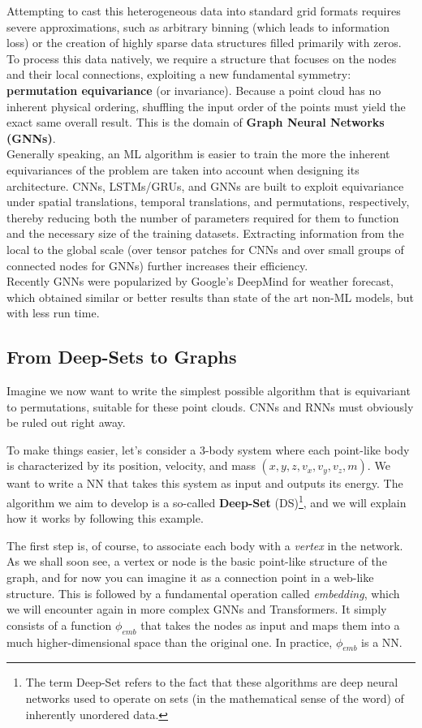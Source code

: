 Attempting to cast this heterogeneous data into standard grid formats requires severe approximations, such as arbitrary binning (which leads to information loss) or the creation of highly sparse data structures filled primarily with zeros. To process this data natively, we require a structure that focuses on the nodes and their local connections, exploiting a new fundamental symmetry: \textbf{permutation equivariance} (or invariance). Because a point cloud has no inherent physical ordering, shuffling the input order of the points must yield the exact same overall result. This is the domain of \textbf{Graph Neural Networks (GNNs)}. \\ 
Generally speaking, an ML algorithm is easier to train the more the inherent equivariances of the problem are taken into account when designing its architecture. CNNs, LSTMs/GRUs, and GNNs are built to exploit equivariance under spatial translations, temporal translations, and permutations, respectively, thereby reducing both the number of parameters required for them to function and the necessary size of the training datasets. Extracting information from the local to the global scale (over tensor patches for CNNs and over small groups of connected nodes for GNNs) further increases their efficiency.\\
Recently GNNs were popularized by Google's DeepMind for weather forecast, which obtained similar or better results than state of the art non-ML models, but with less run time.

\subsection{From Deep-Sets to Graphs}
Imagine we now want to write the simplest possible algorithm that is equivariant to permutations, suitable for these point clouds. CNNs and RNNs must obviously be ruled out right away. 

To make things easier, let's consider a 3-body system where each point-like body is characterized by its position, velocity, and mass $(x, y, z, v_x, v_y, v_z, m)$. We want to write a NN that takes this system as input and outputs its energy. The algorithm we aim to develop is a so-called \textbf{Deep-Set} (DS)\footnote{The term Deep-Set refers to the fact that these algorithms are deep neural networks used to operate on sets (in the mathematical sense of the word) of inherently unordered data.}, and we will explain how it works by following this example.

The first step is, of course, to associate each body with a \textit{vertex} in the network. As we shall soon see, a vertex or node is the basic point-like structure of the graph, and for now you can imagine it as a connection point in a web-like structure. This is followed by a fundamental operation called \textit{embedding}, which we will encounter again in more complex GNNs and Transformers. It simply consists of a function $\phi_{emb}$ that takes the nodes as input and maps them into a much higher-dimensional space than the original one. In practice, $\phi_{emb}$ is a NN. 

